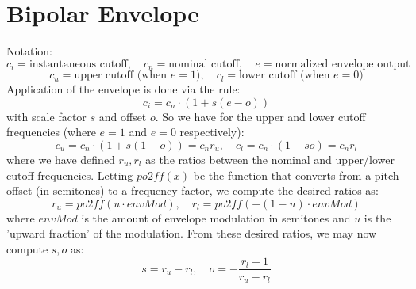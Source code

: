 \section{Bipolar Envelope}
Notation:
\begin{equation}
 c_i = \text{instantaneous cutoff}, \quad c_n = \text{nominal cutoff}, \quad e = \text{normalized envelope output}
\end{equation}
\begin{equation}
 c_u = \text{upper cutoff (when $e = 1$)}, \quad c_l = \text{lower cutoff (when $e = 0$)}
\end{equation}
Application of the envelope is done via the rule:
\begin{equation}
 c_i = c_n \cdot (1 + s (e-o))
\end{equation}
with scale factor $s$ and offset $o$. So we have for the upper and lower cutoff frequencies (where $e=1$ and $e=0$ respectively):
\begin{equation}
 c_u = c_n \cdot (1 + s (1-o)) = c_n r_u, \quad  c_l = c_n \cdot (1 - so) = c_n r_l
\end{equation}
where we have defined $r_u, r_l$ as the ratios between the nominal and upper/lower cutoff frequencies. Letting $po2ff(x)$ be the function that converts from a pitch-offset (in semitones) to a frequency factor, we compute the desired ratios as:
\begin{equation}
 r_u = po2ff(u \cdot envMod), \quad r_l = po2ff(- (1-u) \cdot envMod)
\end{equation}
where $envMod$ is the amount of envelope modulation in semitones and $u$ is the 'upward fraction' of the modulation. From these desired ratios, we may now compute $s, o$ as:
\begin{equation}
 s = r_u-r_l, \quad o = -\frac{r_l-1}{r_u-r_l}
\end{equation}


